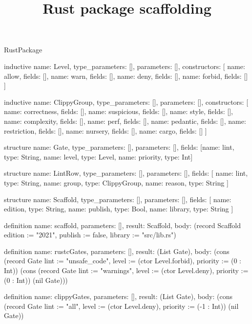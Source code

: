 \begin{lexlean}{RustPackage}
\title{Rust package scaffolding}
\begin{semanticmodule}
inductive{
  name: Level,
  type_parameters: [],
  parameters: [],
  constructors: [
    {name: allow, fields: []},
    {name: warn, fields: []},
    {name: deny, fields: []},
    {name: forbid, fields: []}
  ]
}

inductive{
  name: ClippyGroup,
  type_parameters: [],
  parameters: [],
  constructors: [
    {name: correctness, fields: []},
    {name: suspicious, fields: []},
    {name: style, fields: []},
    {name: complexity, fields: []},
    {name: perf, fields: []},
    {name: pedantic, fields: []},
    {name: restriction, fields: []},
    {name: nursery, fields: []},
    {name: cargo, fields: []}
  ]
}

structure{
  name: Gate,
  type_parameters: [],
  parameters: [],
  fields: [{name: lint, type: String}, {name: level, type: Level}, {name: priority, type: Int}]
}

structure{
  name: LintRow,
  type_parameters: [],
  parameters: [],
  fields: [
    {name: lint, type: String},
    {name: group, type: ClippyGroup},
    {name: reason, type: String}
  ]
}

structure{
  name: Scaffold,
  type_parameters: [],
  parameters: [],
  fields: [
    {name: edition, type: String},
    {name: publish, type: Bool},
    {name: library, type: String}
  ]
}

definition{
  name: scaffold,
  parameters: [],
  result: Scaffold,
  body: (record Scaffold {edition := "2021", publish := false, library := "src/lib.rs"})
}

definition{
  name: rustcGates,
  parameters: [],
  result: (List Gate),
  body: (cons (record Gate {lint := "unsafe_code", level := (ctor Level.forbid), priority := (0 : Int)}) (cons (record Gate {lint := "warnings", level := (ctor Level.deny), priority := (0 : Int)}) (nil Gate)))
}

definition{
  name: clippyGates,
  parameters: [],
  result: (List Gate),
  body: (cons (record Gate {lint := "all", level := (ctor Level.deny), priority := (-1 : Int)}) (nil Gate))
}


\end{semanticmodule}
\end{lexlean}

